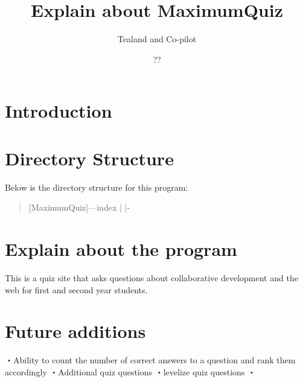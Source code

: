 \documentclass{article}
\title{Explain about MaximumQuiz}  ここでは日本語は表示されなくなる
\author{Tealand and Co-pilot}
\date{??}
\begin{document}
\maketitle

\section{Introduction}


\section{Directory Structure}

Below is the directory structure for this program:

\begin{verse}
[MaximumQuiz]---{index}
      |            
      |-                 
                             

\end{verse}

\section{Explain about the program}

This is a quiz site that asks questions about collaborative development and the web for first and second year students.


\section{Future additions}
・Ability to count the number of correct answers to a question and rank them accordingly
・Additional quiz questions
・levelize quiz questions
・
\end{document}
